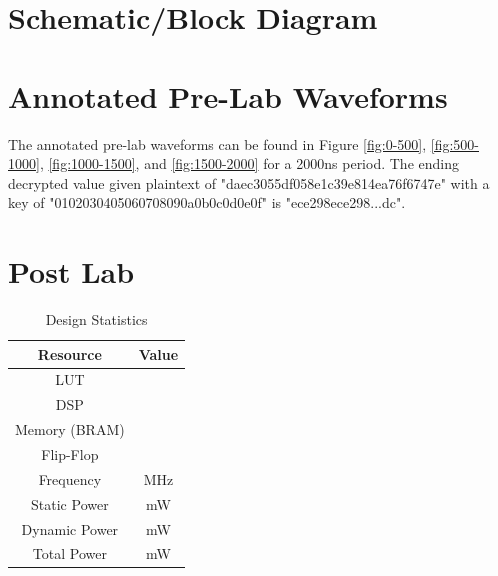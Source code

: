 \documentclass[journal, twocolumn, final,11pt,letterpaper]{IEEEtran}
\begin{document}
\section{Schematic/Block Diagram}

\section{Annotated Pre-Lab Waveforms}
The annotated pre-lab waveforms can be found in Figure \ref{fig:0-500}, \ref{fig:500-1000}, \ref{fig:1000-1500}, and \ref{fig:1500-2000} for a 2000ns period. The ending decrypted value given plaintext of "daec3055df058e1c39e814ea76f6747e" with a key of "0102030405060708090a0b0c0d0e0f" is "ece298ece298...dc".

\section{Post Lab}
\begin{table}[htbp]
	\centering
	\begin{tabular}{c|c}	%
		\toprule	%
		Resource & Value \\
		\midrule
		LUT & \\
		DSP & \\
		Memory (BRAM) & \\
		Flip-Flop & \\
		Frequency &  MHz\\
		Static Power &  mW\\
		Dynamic Power & mW\\
		Total Power & mW\\
		\bottomrule	%
	\end{tabular}%
	\caption{Design Statistics}
	\label{tab:design}
\end{table}
\end{document}
